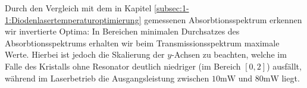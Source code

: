 \documentclass[../../main.tex]{subfiles}
\begin{document}
    Durch den Vergleich mit dem in Kapitel \ref{subsec:1-1:Diodenlasertemperaturoptimierung} gemessenen Absorbtionsspektrum erkennen wir invertierte Optima: In Bereichen minimalen Durchsatzes des Absorbtionsspektrums erhalten wir beim Transmissionsspektrum maximale Werte. Hierbei ist jedoch die Skalierung der $y$-Achsen zu beachten, welche im Falle des Kristalls ohne Resonator deutlich niedriger (im Bereich $[0,2]$) ausfällt, während im Laserbetrieb die Ausgangsleistung zwischen $10\si{\mW}$ und $80\si{\mW}$ liegt.\\
\end{document}
